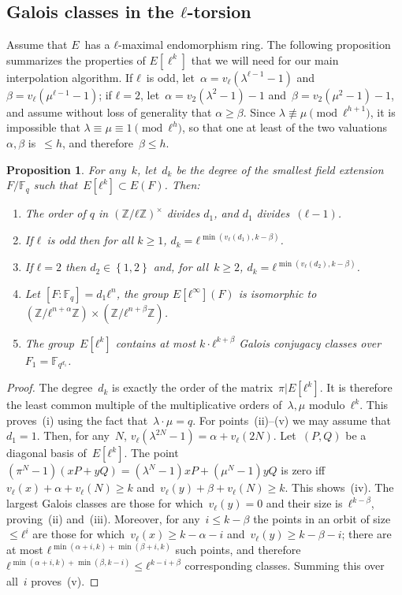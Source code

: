 \documentclass{lms}
\newtheorem{prop}[thm]{Proposition}
\def\acco#1{\left\{#1\right\}}
\newcommand{\F}{\mathbb{F}}
\begin{document}
\subsection{Galois classes in the $ℓ$-torsion}
Assume that $E$~has a $ℓ$-maximal endomorphism ring.  The
following proposition summarizes the properties of $E[\ell^k]$ that we
will need for our main interpolation algorithm.  If $ℓ$~is odd, let~$α
= v_ℓ(λ^{ℓ-1}-1)$ and~$β=v_ℓ(μ^{ℓ-1}-1)$; if $ℓ=2$,
let~$α=v_2(λ^2-1)-1$ and~$β = v_2(μ^2-1)-1$, and assume without loss
of generality that $α ≥ β$.  Since $λ ≢ μ \pmod{ℓ^{h+1}}$, it is
impossible that $λ ≡ μ ≡ 1 \pmod{ℓ^h}$, so that one at least of the two
valuations~$α, β$ is~$≤ h$, and therefore~$β ≤ h$.
\label{sub:classes}
\begin{prop}\label{prop:classes}
For any~$k$, let~$d_k$ be the degree of the smallest field extension $F/\F_q$
such that~$E[ℓ^k]⊂E(F)$. Then:
\begin{enumerate}
\item The order of $q$ in $(ℤ/ℓℤ)^×$ divides $d_1$,
and $d_1$ divides~$(ℓ-1)$.
\item If $ℓ$~is odd then for all $k ≥ 1$,
$ d_k = ℓ^{\min (v_ℓ (d_1), k - β)}$.
\item If $ℓ=2$ then $d_2 ∈ \acco{1,2}$ and, for all~$k ≥ 2$,
$d_k = ℓ^{\min (v_ℓ (d_2), k - β)}$.
\item Let $[F:\F_q]=d_1ℓ^n$, the group $E[ℓ^{∞}](F)$ is isomorphic to~$(ℤ/ℓ^{n+α} ℤ) × (ℤ/ℓ^{n+β} ℤ)$.
\item\label{prop:classes:count} The group~$E[ℓ^k]$ contains at most
$k · ℓ^{k+β}$ Galois conjugacy classes over~$F_1 = \F_{q^{d_1}}$.
\end{enumerate}
\end{prop}
\begin{proof}
The degree~$d_k$ is exactly the order of the matrix~$π|E[ℓ^k]$.
It is therefore the least common multiple of the multiplicative orders
of~$λ, μ$ modulo~$ℓ^k$.
This proves~(i) using the fact that~$λ · μ = q$.
For points~(ii)--(v) we may assume that $d_1 = 1$.
Then, for any~$N$, $v_ℓ(λ^{2N}-1) = α + v_{ℓ} (2N)$.
Let~$(P, Q)$ be a diagonal basis of~$E[ℓ^k]$.
The point $(π^N - 1) (x P + y Q) = (λ^N-1) x P + (μ^N-1) y Q$
is zero iff $v_{ℓ} (x) + α + v_{ℓ} (N) ≥ k$
and~$v_{ℓ} (y) + β + v_{ℓ} (N) ≥ k$. This shows~(iv).
The largest Galois classes
are those for which~$v_{ℓ} (y) = 0$ and their size is~$ℓ^{k - β}$,
proving~(ii) and~(iii).
Moreover, for any~$i ≤ k-β$ the points in an orbit of size~$≤ ℓ^i$
are those for which~$v_{ℓ} (x) ≥ k - α - i$ and~$v_{ℓ} (y) ≥ k - β - i$;
there are at most $ℓ^{\min(α+i, k) + \min (β+i, k)}$ such points,
and therefore $ℓ^{\min(α+i, k) + \min(β, k-i)} ≤ ℓ^{k-i+β}$
corresponding classes.
Summing this over all~$i$ proves~(v).
\end{proof}
\end{document}
